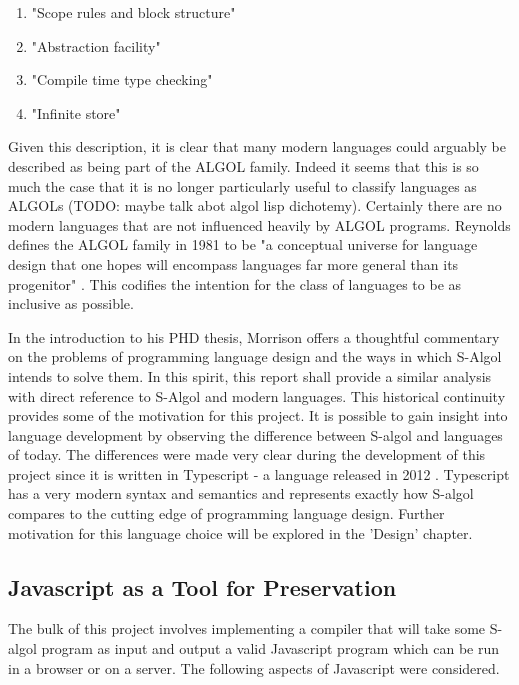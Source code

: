 \documentclass{article}
\begin{document}
\begin{enumerate}
    \item "Scope rules and block structure"
    \item "Abstraction facility"
    \item "Compile time type checking"
    \item "Infinite store"
\end{enumerate}

Given this description, it is clear that many modern languages could arguably be described as being part of the ALGOL family. Indeed it seems that this is so much the case that it is no longer particularly useful to classify languages as ALGOLs (TODO: maybe talk abot algol lisp dichotemy). Certainly there are no modern languages that are not influenced heavily by ALGOL programs. Reynolds defines the ALGOL family in 1981 to be "a conceptual universe for language design that one hopes will encompass languages far more general than its progenitor" \cite{reynolds}. This codifies the intention for the class of languages to be as inclusive as possible. 

In the introduction to his PHD thesis, Morrison offers a thoughtful commentary on the problems of programming language design and the ways in which S-Algol intends to solve them. In this spirit, this report shall provide a similar analysis with direct reference to S-Algol and modern languages. This historical continuity provides some of the motivation for this project. It is possible to gain insight into language development by observing the difference between S-algol and languages of today. The differences were made very clear during the development of this project since it is written in Typescript - a language released in 2012 \cite{jsconf}. Typescript has a very modern syntax and semantics and represents exactly how S-algol compares to the cutting edge of programming language design. Further motivation for this language choice will be explored in the 'Design' chapter.

\subsection{Javascript as a Tool for Preservation}

The bulk of this project involves implementing a compiler that will take some S-algol program as input and output a valid Javascript program which can be run in a browser or on a server. The following aspects of Javascript were considered.
\end{document}
